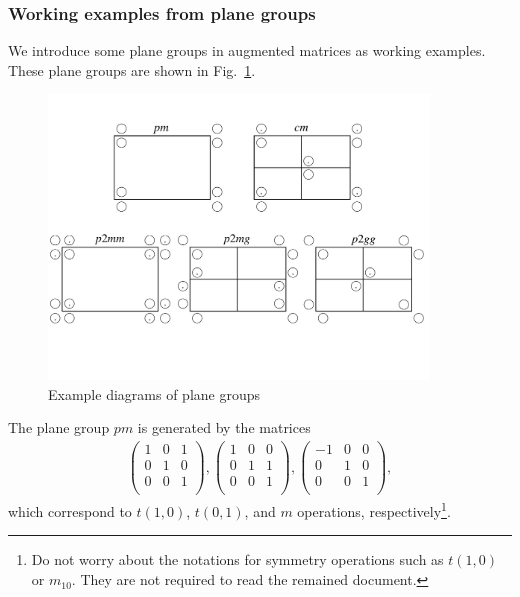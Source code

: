 \subsubsection{Working examples from plane groups}

We introduce some plane groups in augmented matrices as working examples.
These plane groups are shown in Fig.~\ref{fig:plane-group-diagrams}.

\begin{figure}[htb]
  \centering
  \includegraphics[width=0.9\textwidth]{figure/fig_plane_groups.pdf}
  \caption{Example diagrams of plane groups}
  \label{fig:plane-group-diagrams}
\end{figure}


The plane group $pm$ is generated by the matrices
\begin{align*}
  \left(
    \begin{array}{cc|c}
        1 & 0 & 1 \\
        0 & 1 & 0 \\
        \hline
        0 & 0 & 1 \\
    \end{array}
  \right),
  \left(
    \begin{array}{cc|c}
        1 & 0 & 0 \\
        0 & 1 & 1 \\
        \hline
        0 & 0 & 1 \\
    \end{array}
  \right),
  \left(
    \begin{array}{cc|c}
        -1 & 0 & 0 \\
        0  & 1 & 0 \\
        \hline
        0 & 0 & 1 \\
    \end{array}
  \right),
\end{align*}
which correspond to $t(1, 0)$, $t(0, 1)$, and $m$ operations, respectively\footnote{
  Do not worry about the notations for symmetry operations such as $t(1, 0)$ or $m_{10}$.
  They are not required to read the remained document.
}.

